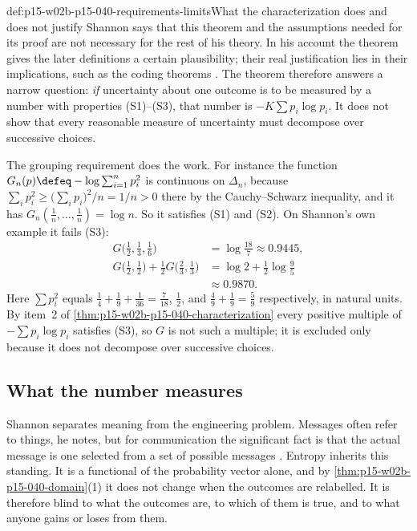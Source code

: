 \begin{hbwarning}{def:p15-w02b-p15-040-requirements-limits}{What the characterization does and does not justify}
Shannon says that this theorem and the assumptions needed for its proof
are not necessary for the rest of his theory. In his account the theorem
gives the later definitions a certain plausibility; their real
justification lies in their implications, such as the coding theorems
\cite[p.~11]{Shannon1948MathematicalTheory}. The theorem therefore
answers a narrow question: \emph{if} uncertainty about one outcome is
to be measured by a number with properties (S1)--(S3), that number is
\(-K\sum p_i\log p_i\). It does not show that every reasonable
measure of uncertainty must decompose over successive choices.

The grouping requirement does the work. For instance the function
\(G_n(p)\defeq-\log\sum_{i=1}^np_i^2\) is continuous on \(\Delta_n\),
because \(\sum_ip_i^2\geq\bigl(\sum_ip_i\bigr)^2/n=1/n>0\) there by the
Cauchy--Schwarz inequality, and it has
\(G_n(\tfrac1n,\ldots,\tfrac1n)=\log n\). So it satisfies (S1) and
(S2). On Shannon's own example it fails (S3):
\[
 \begin{aligned}
 G\bigl(\tfrac12,\tfrac13,\tfrac16\bigr)&=\log\tfrac{18}7\approx0.9445,\\
 G\bigl(\tfrac12,\tfrac12\bigr)+\tfrac12G\bigl(\tfrac23,\tfrac13\bigr)
   &=\log2+\tfrac12\log\tfrac95\\
   &\approx0.9870 .
 \end{aligned}
\]
Here \(\sum p_i^2\) equals \(\tfrac14+\tfrac19+\tfrac1{36}=\tfrac7{18}\),
\(\tfrac12\), and \(\tfrac49+\tfrac19=\tfrac59\) respectively, in
natural units. By item~2 of
\cref{thm:p15-w02b-p15-040-characterization} every positive multiple of
\(-\sum p_i\log p_i\) satisfies (S3), so \(G\) is not such a multiple; it
is excluded only because it does not decompose over successive choices.
\end{hbwarning}

\subsection{What the number measures}
\label{sec:p15-w02b-p15-040-meaning}

Shannon separates meaning from the engineering problem. Messages often
refer to things, he notes, but for communication the significant fact
is that the actual message is one selected from a set of possible
messages \cite[p.~1]{Shannon1948MathematicalTheory}. Entropy inherits
this standing. It is a functional of the probability vector alone, and
by \cref{thm:p15-w02b-p15-040-domain}(1) it does not change when the
outcomes are relabelled. It is therefore blind to what the outcomes
are, to which of them is true, and to what anyone gains or loses from
them.

